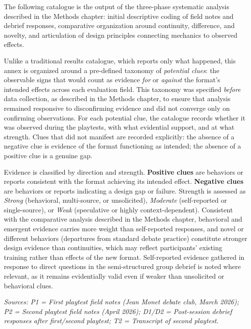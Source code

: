 \documentclass[12pt]{article}
\begin{document}
The following catalogue is the output of the three-phase systematic analysis described in the Methods chapter: initial descriptive coding of field notes and debrief responses, comparative organization around continuity, difference, and novelty, and articulation of design principles connecting mechanics to observed effects.

Unlike a traditional results catalogue, which reports only what happened, this annex is organized around a pre-defined taxonomy of \textit{potential clues}: the observable signs that would count as evidence \textit{for} or \textit{against} the format's intended effects across each evaluation field. This taxonomy was specified \textit{before} data collection, as described in the Methods chapter, to ensure that analysis remained responsive to disconfirming evidence and did not converge only on confirming observations. For each potential clue, the catalogue records whether it was observed during the playtests, with what evidential support, and at what strength. Clues that did not manifest are recorded explicitly: the absence of a negative clue is evidence of the format functioning as intended; the absence of a positive clue is a genuine gap.

Evidence is classified by direction and strength. \textbf{Positive clues} are behaviors or reports consistent with the format achieving its intended effect. \textbf{Negative clues} are behaviors or reports indicating a design gap or failure. Strength is assessed as \textit{Strong} (behavioral, multi-source, or unsolicited), \textit{Moderate} (self-reported or single-source), or \textit{Weak} (speculative or highly context-dependent). Consistent with the comparative analysis described in the Methods chapter, behavioral and emergent evidence carries more weight than self-reported responses, and novel or different behaviors (departures from standard debate practice) constitute stronger design evidence than continuities, which may reflect participants' existing training rather than effects of the new format. Self-reported evidence gathered in response to direct questions in the semi-structured group debrief is noted where relevant, as it remains evidentially valid even if weaker than unsolicited or behavioral clues.

\textit{Sources: P1 = First playtest field notes (Jean Monet debate club, March 2026); P2 = Second playtest field notes (April 2026); D1/D2 = Post-session debrief responses after first/second playtest; T2 = Transcript of second playtest.}
\end{document}
